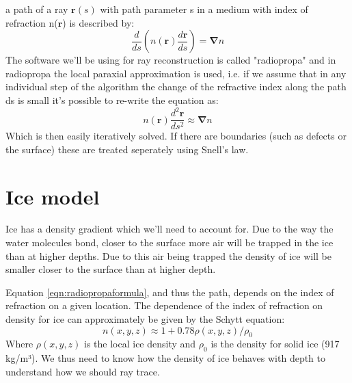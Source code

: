 \documentclass[11pt,a4paper,faculty=we,language=en,doctype=report]{cls/ugent-doc}
\begin{document}
a path of a ray $\mathbf{r}(s)$ with path parameter s in a medium
with index of refraction n($\mathbf{r}$) is described by:
\begin{equation}
	\frac{d}{ds}\left(n(\mathbf{r})\frac{d\mathbf{r}}{ds}\right) = \mathbf{\nabla} n
\end{equation}
The software we'll be using for ray reconstruction is called
"radiopropa" \cite{Winchen_2019} and in radiopropa the
local paraxial approximation is used, i.e. if we assume that in any
individual step of the algorithm the change of the refractive index
along the path ds is small it's possible to
re-write the equation as:
\begin{equation}
	n(\mathbf{r})\frac{d^2\mathbf{r}}{ds^2} \approx \mathbf{\nabla} n
	\label{eqn:radiopropaformula}
\end{equation}
Which is then easily iteratively solved.
If there are boundaries (such as defects or the surface)
these are treated seperately using Snell's law. 
\section{Ice model}
\label{section:Ice Model}
Ice has a density gradient which we'll need to account for. Due to the way the
water molecules bond, closer to the surface more air will be trapped in the ice
than at higher depths.  Due to this air being trapped the density of ice will
be smaller closer to the surface than at higher depth.  

Equation \ref{eqn:radiopropaformula}, and thus the path, depends on the index
of refraction on a given location.  The dependence of the index of refraction
on density for ice can approximately be given by the Schytt equation:
\begin{equation} n(x,y,z) \approx 1 + 0.78\rho(x,y,z)/\rho_0 \label{eqn:Schytt}
\end{equation} Where $\rho(x,y,z)$ is the local ice density and $\rho_0$ is the
density for solid ice (917 kg/m³). We thus need to know how the density of
ice behaves with depth to understand how we should ray trace.
\end{document}
